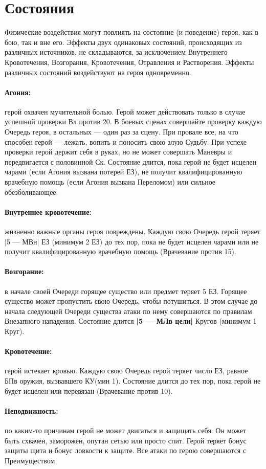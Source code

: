 \section{Состояния}
Физические  воздействия могут повлиять на состояние (и поведение) героя, как в бою, так и вне его. Эффекты двух
одинаковых состояний, происходящих из различных источников, не складываются, за исключением Внутреннего Кровотечения, Возгорания, Кровотечения, Отравления и Растворения. Эффекты различных состояний воздействуют на героя одновременно.
\paragraph{Агония:} герой охвачен мучительной болью. Герой может действовать только в случае успешной проверки Вл против 20. В боевых сценах совершайте проверку каждую Очередь героя, в остальных — один раз за сцену. При провале все, на что способен герой — лежать, вопить и поносить свою злую Судьбу. При успехе проверки герой держит себя в руках, но не может совершать Маневры и передвигается с половинной Ск. Состояние длится, пока герой не будет исцелен чарами (если Агония вызвана потерей ЕЗ), не получит квалифицированную врачебную помощь (если Агония вызвана Переломом) или сильное обезболивающее.
\paragraph{Внутреннее кровотечение:} жизненно важные органы героя повреждены. Каждую свою Очередь герой теряет |5 — МВн| ЕЗ (минимум 2 ЕЗ) до тех пор, пока не будет исцелен чарами или не получит квалифицированную врачебную помощь (Врачевание против 15).
\paragraph{Возгорание:} в начале своей Очереди горящее существо или предмет теряет 5 ЕЗ. Горящее существо может пропустить свою Очередь, чтобы потушиться. В этом случае до начала следующей Очереди существа атаки по нему совершаются по правилам Внезапного нападения. Состояние длится \textbf{|5 — МЛв цели|} Кругов (минимум 1 Круг).
\paragraph{Кровотечение:} герой истекает кровью. Каждую свою Очередь герой теряет число ЕЗ, равное БПв оружия, вызвавшего КУ(мин 1). Состояние длится до тех пор, пока герой не будет исцелен или перевязан (Врачевание против 10).
\paragraph{Неподвижность:} по каким-то причинам герой не может двигаться и защищать себя. Он может быть схвачен, заморожен, опутан сетью или просто спит. Герой теряет бонус защиты щита и бонус ловкости к защите. Все атаки по герою совершаются с Преимуществом.
